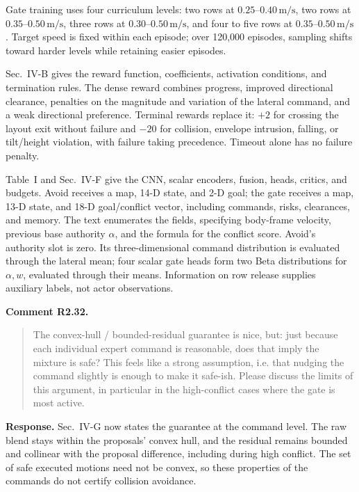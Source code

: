 \documentclass[letterpaper,11pt]{article}
\begin{document}
Gate training uses four curriculum levels: two rows at $0.25$--$0.40\,\mathrm{m/s}$, two rows at $0.35$--$0.50\,\mathrm{m/s}$, three rows at $0.30$--$0.50\,\mathrm{m/s}$, and four to five rows at $0.35$--$0.50\,\mathrm{m/s}$. Target speed is fixed within each episode; over 120,000 episodes, sampling shifts toward harder levels while retaining easier episodes.

Sec.~IV-B gives the reward function, coefficients, activation conditions, and termination rules. The dense reward combines progress, improved directional clearance, penalties on the magnitude and variation of the lateral command, and a weak directional preference.  Terminal rewards replace it: $+2$ for crossing the layout exit without failure and $-20$ for collision, envelope intrusion, falling, or tilt/height violation, with failure taking precedence. Timeout alone has no failure penalty.

Table~I and Sec.~IV-F give the CNN, scalar encoders, fusion, heads, critics, and budgets. Avoid receives a map, 14-D state, and 2-D goal; the gate receives a map, 13-D state, and 18-D goal/conflict vector, including commands, risks, clearances, and memory. The text enumerates the fields, specifying body-frame velocity, previous base authority $\alpha$, and the formula for the conflict score. Avoid's authority slot is zero. Its three-dimensional command distribution is evaluated through the lateral mean; four scalar gate heads form two Beta distributions for $\alpha,w$, evaluated through their means. Information on row release supplies auxiliary labels, not actor observations.
\par\nopagebreak[4]


\noindent\textbf{Comment R2.32.}
\begin{quote}\color{reviewgray}
The convex-hull / bounded-residual guarantee is nice, but: just because each individual expert command is reasonable, does that imply the mixture is safe? This feels like a strong assumption, i.e. that nudging the command slightly is enough to make it safe-ish. Please discuss the limits of this argument, in particular in the high-conflict cases where the gate is most active.
\end{quote}
\noindent\textbf{Response.}
Sec.~IV-G now states the guarantee at the command level. The raw blend stays within the proposals' convex hull, and the residual remains bounded and collinear with the proposal difference, including during high conflict. The set of safe executed motions need not be convex, so these properties of the commands do not certify collision avoidance.
\par\nopagebreak[4]
\end{document}
